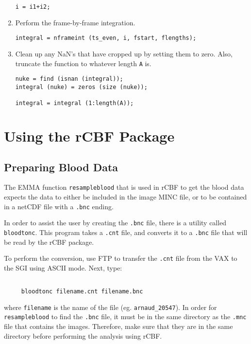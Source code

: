 \documentclass[12pt]{article}
\def\code#1{{\tt #1}}
\begin{document}
\begin{enumerate}
\begin{verbatim}
i = i1+i2;
\end{verbatim}

\item Perform the frame-by-frame integration.
\begin{verbatim}
integral = nframeint (ts_even, i, fstart, flengths);
\end{verbatim}

\item Clean up any NaN's that have cropped up by setting them to zero.
Also, truncate the function to whatever length \code{A} is.
\begin{verbatim}
nuke = find (isnan (integral));
integral (nuke) = zeros (size (nuke));

integral = integral (1:length(A));
\end{verbatim}
\end{enumerate}


\newpage
\section{Using the rCBF Package}

\subsection{Preparing Blood Data}

The EMMA function \code{resampleblood} that is used in rCBF to get
the blood data expects the data to either be included in the image
MINC file, or to be contained in a netCDF file with a \code{.bnc}
ending.

In order to assist the user by creating the \code{.bnc} file, there
is a utility called \code{bloodtonc}.  This program takes a
\code{.cnt} file, and converts it to a \code{.bnc} file that will be
read by the rCBF package.

To perform the conversion, use FTP to transfer the \code{.cnt} file
from the VAX to the SGI using ASCII mode.  Next, type:

\begin{verbatim}

     bloodtonc filename.cnt filename.bnc

\end{verbatim}

where \code{filename} is the name of the file (eg.
\code{arnaud\_20547}).  In order for \code{resampleblood} to find the
\code{.bnc} file, it must be in the same directory as the \code{.mnc}
file that contains the images.  Therefore, make sure that they are in
the same directory before performing the analysis using rCBF.
\end{document}
